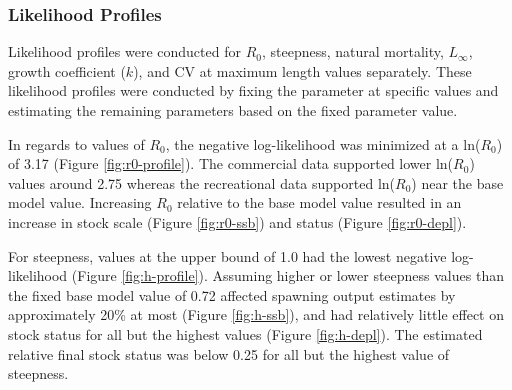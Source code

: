 \documentclass[11pt,
  english,
  a4paper,
]{article}
\begin{document}

\hypertarget{likelihood-profiles}{%
\subsubsection{Likelihood Profiles}\label{likelihood-profiles}}

\leavevmode\tagmcend\tagstructend


Likelihood profiles were conducted for {\(R_0\)\leavevmode\tagmcend\tagstructend}, steepness, natural mortality, {\(L_{\infty}\)\leavevmode\tagmcend\tagstructend}, growth coefficient ({\(k\)\leavevmode\tagmcend\tagstructend}), and CV at maximum length values separately. These likelihood profiles were conducted by fixing the parameter at specific values and estimating the remaining parameters based on the fixed parameter value.

\leavevmode\tagmcend\tagstructend\par


In regards to values of {\(R_0\)\leavevmode\tagmcend\tagstructend}, the negative log-likelihood was minimized at a ln({\(R_0\)\leavevmode\tagmcend\tagstructend}) of 3.17 (Figure \ref{fig:r0-profile}). The commercial data supported lower ln({\(R_0\)\leavevmode\tagmcend\tagstructend}) values around 2.75 whereas the recreational data supported ln({\(R_0\)\leavevmode\tagmcend\tagstructend}) near the base model value. Increasing {\(R_0\)\leavevmode\tagmcend\tagstructend} relative to the base model value resulted in an increase in stock scale (Figure \ref{fig:r0-ssb}) and status (Figure \ref{fig:r0-depl}).

\leavevmode\tagmcend\tagstructend\par


For steepness, values at the upper bound of 1.0 had the lowest negative log-likelihood (Figure \ref{fig:h-profile}). Assuming higher or lower steepness values than the fixed base model value of 0.72 affected spawning output estimates by approximately 20\% at most (Figure \ref{fig:h-ssb}), and had relatively little effect on stock status for all but the highest values (Figure \ref{fig:h-depl}). The estimated relative final stock status was below 0.25 for all but the highest value of steepness.
\end{document}
